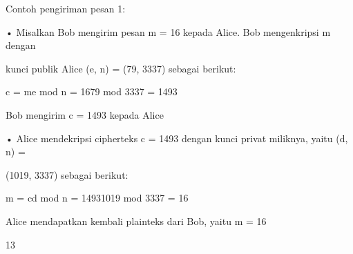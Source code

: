 \documentclass{article}
\begin{document}

Contoh pengiriman pesan 1: 

• Misalkan Bob mengirim pesan m = 16 kepada Alice. Bob mengenkripsi m dengan 

kunci publik Alice (e, n) = (79, 3337) sebagai berikut:

           c = me mod n  = 1679 mod 3337 = 1493

   Bob mengirim c = 1493 kepada Alice

• Alice mendekripsi cipherteks c = 1493 dengan kunci privat miliknya, yaitu (d, n) = 

(1019, 3337) sebagai berikut:


 m = cd mod n  = 14931019 mod 3337 = 16

   Alice mendapatkan kembali plainteks dari Bob, yaitu m = 16

13
\end{document}
